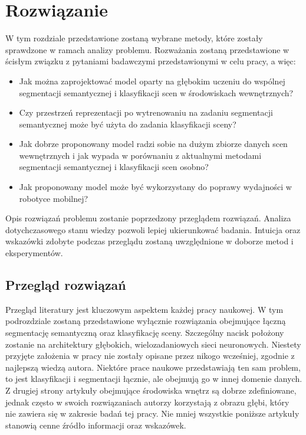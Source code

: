 \newpage %
\section{Rozwiązanie}

W tym rozdziale przedstawione zostaną wybrane metody, które zostały sprawdzone w ramach analizy problemu. Rozważania zostaną przedstawione w ścisłym związku z pytaniami badawczymi przedstawionymi w celu pracy, a więc:

\begin{itemize}
    \item Jak można zaprojektować model oparty na głębokim uczeniu do wspólnej segmentacji semantycznej i klasyfikacji scen w środowiskach wewnętrznych?
    \item Czy przestrzeń reprezentacji po wytrenowaniu na zadaniu segmentacji semantycznej może być użyta do zadania klasyfikacji sceny?
    \item Jak dobrze proponowany model radzi sobie na dużym zbiorze danych scen wewnętrznych i jak wypada w porównaniu z aktualnymi metodami segmentacji semantycznej i klasyfikacji scen osobno?
    \item Jak proponowany model może być wykorzystany do poprawy wydajności w robotyce mobilnej?
\end{itemize}
Opis rozwiązań problemu zostanie poprzedzony przeglądem rozwiązań. Analiza dotychczasowego stanu wiedzy pozwoli lepiej ukierunkować badania. Intuicja oraz wskazówki zdobyte podczas przeglądu zostaną uwzględnione w doborze metod i eksperymentów.

\subsection{Przegląd rozwiązań}
Przegląd literatury jest kluczowym aspektem każdej pracy naukowej. W tym podrozdziale zostaną przedstawione wyłącznie rozwiązania obejmujące łączną segmentację semantyczną oraz klasyfikację sceny. Szczególny nacisk położony zostanie na architektury głębokich, wielozadaniowych sieci neuronowych. Niestety przyjęte założenia w pracy nie zostały opisane przez nikogo wcześniej, zgodnie z najlepszą wiedzą autora. Niektóre prace naukowe przedstawiają ten sam problem, to jest klasyfikacji i segmentacji łącznie, ale obejmują go w innej domenie danych. Z drugiej strony artykuły obejmujące środowiska wnętrz są dobrze zdefiniowane, jednak często w swoich rozwiązaniach autorzy korzystają z obrazu głębi, który nie zawiera się w zakresie badań tej pracy. Nie mniej wszystkie poniższe artykuły stanowią cenne źródło informacji oraz wskazówek.


